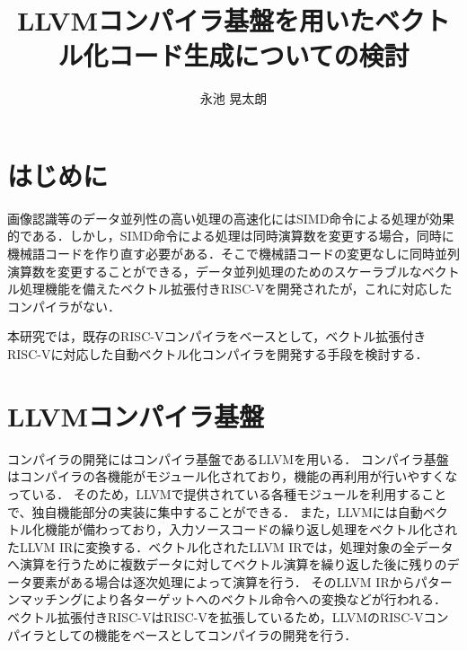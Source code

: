 ﻿\documentclass[a4j]{jarticle}
\title{LLVMコンパイラ基盤を用いたベクトル化コード生成についての検討}
\author{永池 晃太朗}
\begin{document}
\maketitle

\section{はじめに}
画像認識等のデータ並列性の高い処理の高速化にはSIMD命令による処理が効果的である．しかし，SIMD命令による処理は同時演算数を変更する場合，同時に機械語コードを作り直す必要がある．そこで機械語コードの変更なしに同時並列演算数を変更することができる，データ並列処理のためのスケーラブルなベクトル処理機能を備えたベクトル拡張付きRISC-Vを開発された\cite{bib:kimura}が，これに対応したコンパイラがない．

本研究では，既存のRISC-Vコンパイラをベースとして，ベクトル拡張付きRISC-Vに対応した自動ベクトル化コンパイラを開発する手段を検討する\cite{bib:ngik}．

%
%
%

\section{LLVMコンパイラ基盤}
コンパイラの開発にはコンパイラ基盤であるLLVM\cite{bib:llvm}を用いる．
コンパイラ基盤はコンパイラの各機能がモジュール化されており，機能の再利用が行いやすくなっている．
そのため，LLVMで提供されている各種モジュールを利用することで、独自機能部分の実装に集中することができる．
また，LLVMには自動ベクトル化機能が備わっており，入力ソースコードの繰り返し処理をベクトル化されたLLVM IRに変換する．ベクトル化されたLLVM IRでは，処理対象の全データへ演算を行うために複数データに対してベクトル演算を繰り返した後に残りのデータ要素がある場合は逐次処理によって演算を行う．
そのLLVM IRからパターンマッチングにより各ターゲットへのベクトル命令への変換などが行われる．
ベクトル拡張付きRISC-VはRISC-Vを拡張しているため，LLVMのRISC-Vコンパイラとしての機能をベースとしてコンパイラの開発を行う．
\end{document}
